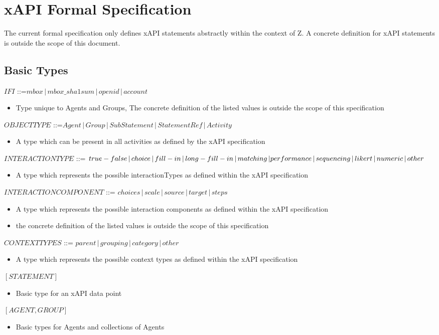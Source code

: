 \documentclass[../main.tex]{subfiles}
\begin{document}
\section{xAPI Formal Specification}
The current formal specification only defines xAPI statements
abstractly within the context of Z. A concrete definition for xAPI
statements is outside the scope of this document.

\subsection{Basic Types}
$IFI$ ::=$ mbox \,|\, mbox\_sha1sum \,|\, openid \,|\, account$
\begin{itemize}
\item Type unique to Agents and Groups, The concrete definition of the listed values
  is outside the scope of this specification
\end{itemize}
$OBJECTTYPE$ ::=$ Agent \,|\, Group \,|\, SubStatement \,|\,
StatementRef \,|\, Activity$
\begin{itemize}
\item A type which can be present in all activities as defined by
  the xAPI specification
\end{itemize}
$INTERACTIONTYPE$ ::= $true-false \,|\, choice \,|\, fill-in \,|\,
long-fill-in \,|\, matching \,| \\ performance \,|\, sequencing \,|\,
likert \,|\, numeric \,|\, other$
\begin{itemize}
\item A type which represents the possible interactionTypes as
  defined within the xAPI specification
\end{itemize}
$INTERACTIONCOMPONENT$ ::= $choices \,|\, scale \,|\, source \,|\,
target \,|\, steps$
\begin{itemize}
\item A type which represents the possible interaction components as
  defined within the xAPI specification
\item the concrete definition of the listed values is outside the
  scope of this specification
\end{itemize}
$CONTEXTTYPES$ ::= $parent \,|\, grouping \,|\, category \,|\, other$
\begin{itemize}
\item A type which represents the possible context types as
  defined within the xAPI specification
\end{itemize}
$[STATEMENT]$
\begin{itemize}
\item Basic type for an xAPI data point
\end{itemize}
$[AGENT, GROUP]$
\begin{itemize}
\item Basic types for Agents and collections of Agents
\end{itemize}
\end{document}
